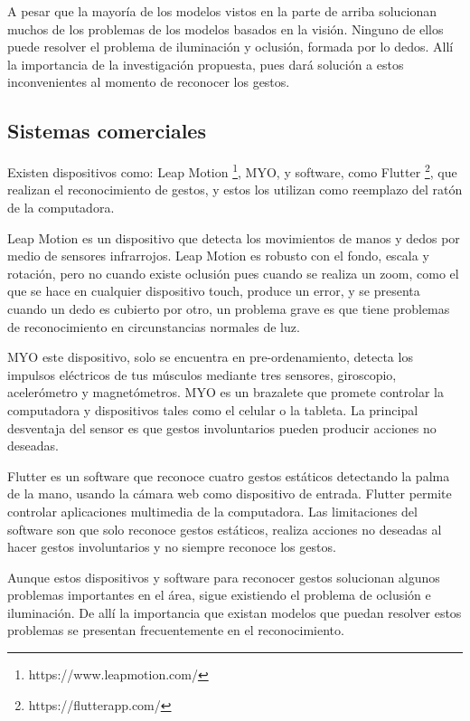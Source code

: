  

A pesar que la mayoría de los modelos vistos en la parte de arriba solucionan muchos de los problemas de los modelos basados en la visi\'on. Ninguno de ellos puede resolver el problema de iluminaci\'on y oclusi\'on, formada por lo dedos. All\'i la importancia de la investigaci\'on propuesta, pues dar\'a soluci\'on a estos inconvenientes al momento de reconocer los gestos.
 
\subsection{Sistemas comerciales}

Existen dispositivos como: Leap Motion \footnote{https://www.leapmotion.com/}, MYO, y software, como Flutter \footnote{https://flutterapp.com/}, que realizan el reconocimiento de gestos, y estos los utilizan como reemplazo del rat\'on de la computadora. 
 
Leap Motion es un dispositivo que detecta los movimientos de manos y dedos por medio de sensores infrarrojos. Leap Motion es robusto con el fondo, escala y rotaci\'on,  pero no cuando existe oclusi\'on pues cuando se realiza un zoom, como el que se hace en cualquier dispositivo touch, produce un error, y se presenta cuando un dedo es cubierto por otro, un problema grave es que tiene problemas de reconocimiento en circunstancias normales de luz.  

MYO este dispositivo, solo se encuentra en pre-ordenamiento, detecta los impulsos el\'ectricos de tus m\'usculos mediante tres sensores, giroscopio, aceler\'ometro y magnet\'ometros. MYO es un brazalete  que promete controlar la computadora y dispositivos tales como el celular o la tableta. La principal desventaja del sensor es que gestos involuntarios pueden producir acciones no deseadas.

Flutter  es un software que reconoce cuatro gestos est\'aticos detectando la palma de la mano, usando la c\'amara web como dispositivo de entrada. Flutter permite controlar aplicaciones multimedia de la computadora. 	Las limitaciones del software son que solo reconoce gestos est\'aticos, realiza acciones no deseadas al hacer gestos involuntarios y no siempre reconoce los gestos. 

Aunque estos dispositivos y software para reconocer gestos  solucionan algunos problemas importantes en el \'area, sigue existiendo el problema de oclusi\'on  e iluminaci\'on. De allí la importancia que existan modelos que puedan resolver estos problemas se presentan frecuentemente en el reconocimiento. 


